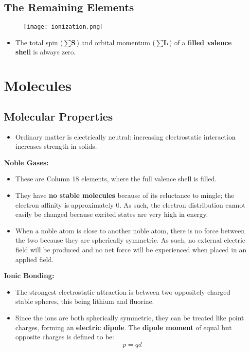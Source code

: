 \documentclass[12pt, letterpaper, twoside]{article}
\begin{document}
\subsection{The Remaining Elements}

\begin{figure}[!ht]
    \centering
    \texttt{[image: ionization.png]}
\end{figure}

\begin{itemize}
    \item The total spin ($\sum \textbf{S}$) and orbital momentum ($\sum\textbf{L}$) of a \textbf{filled valence shell} is always zero.
\end{itemize}

\section{Molecules}

\subsection{Molecular Properties}

\begin{itemize}
    \item Ordinary matter is electrically neutral: increasing electrostatic interaction increases strength in solids.
\end{itemize}
\textbf{Noble Gases:}
\begin{itemize}
    \item These are Column 18 elements, where the full valence shell is filled.
    \item They have \textbf{no stable molecules} because of its reluctance to mingle; the electron affinity is approximately 0. As such, the electron distribution cannot easily be changed because excited states are very high in energy.
    \item When a noble atom is close to another noble atom, there is no force between the two because they are spherically symmetric. As such, no external electric field will be produced and no net force will be experienced when placed in an applied field.
\end{itemize}
\textbf{Ionic Bonding:}

\begin{itemize}
    \item The strongest electrostatic attraction is between two oppositely charged stable spheres, this being lithium and fluorine.
    \item Since the ions are both spherically symmetric, they can be treated like point charges, forming an \textbf{electric dipole}. The \textbf{dipole moment} of equal but opposite charges is defined to be:
    \begin{equation*}
        p = qd
    \end{equation*}
\end{itemize}
\end{document}
